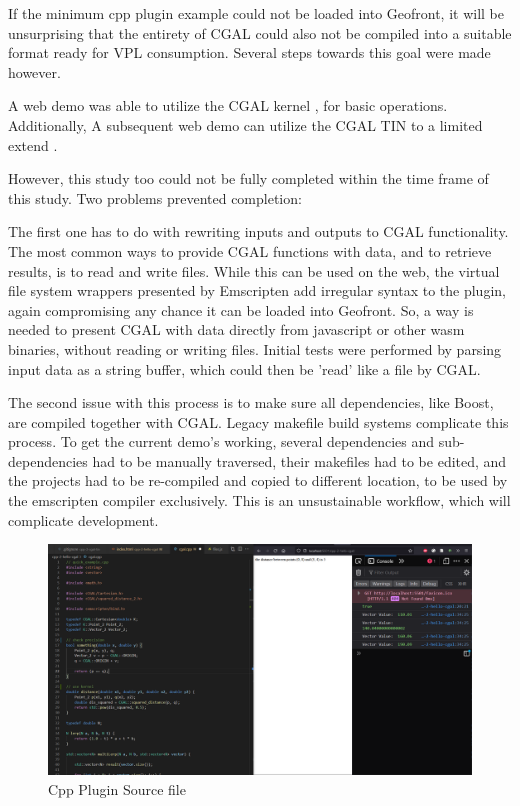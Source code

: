 If the minimum cpp plugin example could not be loaded into Geofront, it will be unsurprising that the entirety of CGAL could also not be compiled into a suitable format ready for VPL consumption.
Several steps towards this goal were made however.

A web demo was able to utilize the CGAL kernel , for basic operations. 
Additionally, A subsequent web demo can utilize the CGAL TIN to a limited extend .

However, this study too could not be fully completed within the time frame of this study. 
Two problems prevented completion:

The first one has to do with rewriting inputs and outputs to CGAL functionality.
The most common ways to provide CGAL functions with data, and to retrieve results, is to read and write files. 
While this can be used on the web, the virtual file system wrappers presented by Emscripten add irregular syntax to the plugin, again compromising any chance it can be loaded into Geofront.
So, a way is needed to present CGAL with data directly from javascript or other wasm binaries, without reading or writing files. 
Initial tests were performed by parsing input data as a string buffer, which could then be 'read' like a file by CGAL.

The second issue with this process is to make sure all dependencies, like Boost, are compiled together with CGAL.
Legacy makefile build systems complicate this process. 
To get the current demo's working, several dependencies and sub-dependencies had to be manually traversed, their makefiles had to be edited, and the projects had to be re-compiled and copied to different location, to be used by the emscripten compiler exclusively. 
This is an unsustainable workflow, which will complicate development.  

\begin{figure}
  \graphicspath{{../../assets/images/6.1.4/}}
  \centering
  \includegraphics[width=0.50\linewidth]{demo-2.PNG}
  \caption[loading a plugin]{Cpp Plugin Source file}
  \label{fig:cgal-tryout-2}
\end{figure}

